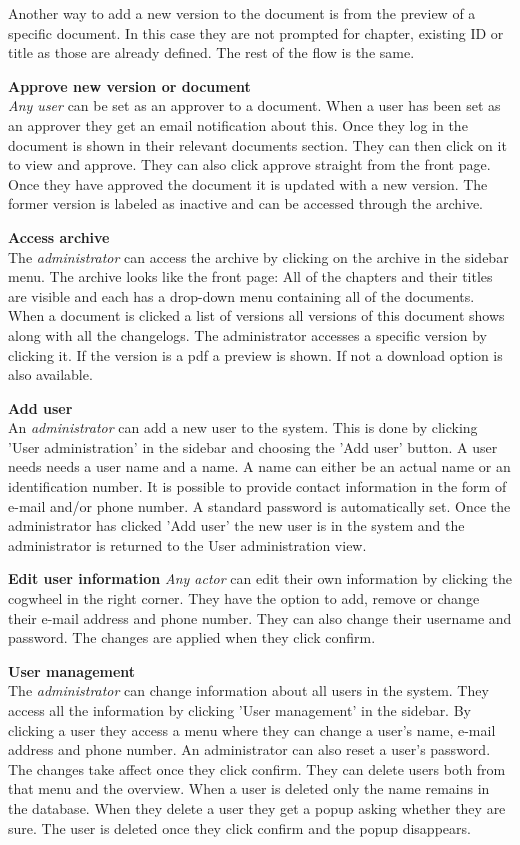 Another way to add a new version to the document is from the preview of a specific document.
In this case they are not prompted for chapter, existing ID or title as those are already defined.
The rest of the flow is the same.

\textbf{Approve new version or document}
\\
\textit{Any user} can be set as an approver to a document.
When a user has been set as an approver they get an email notification about this.
Once they log in the document is shown in their relevant documents section.
They can then click on it to view and approve.
They can also click approve straight from the front page.
Once they have approved the document it is updated with a new version.
The former version is labeled as inactive and can be accessed through the archive.

\textbf{Access archive}
\\
The \textit{administrator} can access the archive by clicking on the archive in the sidebar menu.
The archive looks like the front page:
All of the chapters and their titles are visible and each has a drop-down menu containing all of the documents.
When a document is clicked a list of versions all versions of this document shows along with all the changelogs.
The administrator accesses a specific version by clicking it.
If the version is a pdf a preview is shown.
If not a download option is also available.

\textbf{Add user}
\\
An \textit{administrator} can add a new user to the system.
This is done by clicking 'User administration' in the sidebar and choosing the 'Add user' button.
A user needs needs a user name and a name.
A name can either be an actual name or an identification number.
It is possible to provide contact information in the form of e-mail and/or phone number.
A standard password is automatically set.
Once the administrator has clicked 'Add user' the new user is in the system and the administrator is returned to the User administration view.

\textbf{Edit user information}
\textit{Any actor} can edit their own information by clicking the cogwheel in the right corner.
They have the option to add, remove or change their e-mail address and phone number.
They can also change their username and password.
The changes are applied when they click confirm.

\textbf{User management}
\\
The \textit{administrator} can change information about all users in the system.
They access all the information by clicking 'User management' in the sidebar.
By clicking a user they access a menu where they can change a user's name, e-mail address and phone number.
An administrator can also reset a user's password.
The changes take affect once they click confirm.
They can delete users both from that menu and the overview.
When a user is deleted only the name remains in the database.
When they delete a user they get a popup asking whether they are sure.
The user is deleted once they click confirm and the popup disappears.

